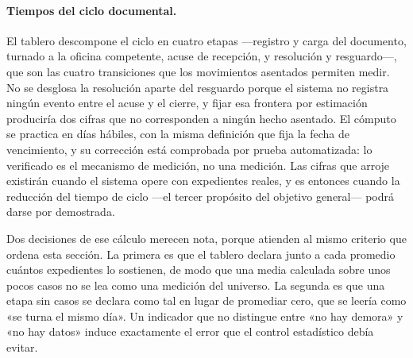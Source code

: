 \paragraph{Tiempos del ciclo documental.}
El tablero descompone el ciclo en cuatro etapas —registro y carga del documento, turnado a la oficina competente, acuse de recepción, y resolución y resguardo—, que son las cuatro transiciones que los movimientos asentados permiten medir. No se desglosa la resolución aparte del resguardo porque el sistema no registra ningún evento entre el acuse y el cierre, y fijar esa frontera por estimación produciría dos cifras que no corresponden a ningún hecho asentado. El cómputo se practica en días hábiles, con la misma definición que fija la fecha de vencimiento, y su corrección está comprobada por prueba automatizada: lo verificado es el mecanismo de medición, no una medición. Las cifras que arroje existirán cuando el sistema opere con expedientes reales, y es entonces cuando la reducción del tiempo de ciclo —el tercer propósito del objetivo general— podrá darse por demostrada.

Dos decisiones de ese cálculo merecen nota, porque atienden al mismo criterio que ordena esta sección. La primera es que el tablero declara junto a cada promedio cuántos expedientes lo sostienen, de modo que una media calculada sobre unos pocos casos no se lea como una medición del universo. La segunda es que una etapa sin casos se declara como tal en lugar de promediar cero, que se leería como «se turna el mismo día». Un indicador que no distingue entre «no hay demora» y «no hay datos» induce exactamente el error que el control estadístico debía evitar.
